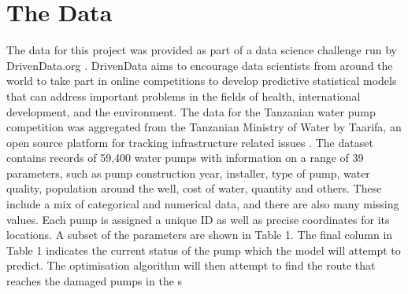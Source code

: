 \documentclass{article} %
\begin{document}
\section{The Data}

The data for this project was provided as part of a data science challenge run by DrivenData.org \cite{DrivenData2015}. DrivenData aims to encourage data scientists from around the world to take part in online competitions to develop predictive statistical models that can address important problems in the fields of health, international development, and the environment. The data for the Tanzanian water pump competition was aggregated from the Tanzanian Ministry of Water by Taarifa, an open source platform for tracking infrastructure related issues \cite{Taarifa2015}.  The dataset contains records of 59,400 water pumps with information on a range of 39 parameters, such as pump construction year, installer, type of pump, water quality, population around the well, cost of water, quantity and others. These include a mix of categorical and numerical data, and there are also many missing values. Each pump is assigned a unique ID as well as precise coordinates for its locations. A subset of the parameters are shown in Table 1. The final column in Table 1 indicates the current status of the pump which the model will attempt to predict. The optimisation algorithm will then attempt to find the route that reaches the damaged pumps in the s

\begin{table}[H]
\caption{The DrivenData Tanzania Dataset}
\centering
{}
\end{table}
\end{document}
